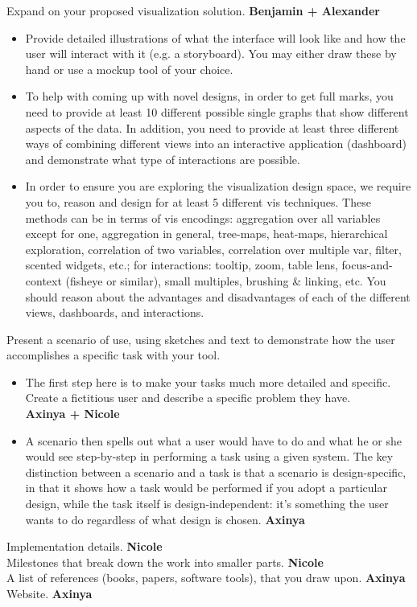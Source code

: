 \documentclass{article}
\begin{document}
 Expand on your proposed visualization solution. \textbf{Benjamin + Alexander}
\begin{itemize}
\item Provide detailed illustrations of what the interface will look like and how the user will interact with it (e.g. a storyboard). You may either draw these by hand or use a mockup tool of your choice.
\item To help with coming up with novel designs, in order to get full marks, you need to provide at least 10 different possible single graphs that show different aspects of the data. In addition, you need to provide at least three different ways of combining different views into an interactive application (dashboard) and demonstrate what type of interactions are possible.
\item In order to ensure you are exploring the visualization design space, we require you to, reason and design for at least 5 different vis techniques. These methods can be in terms of vis encodings: aggregation over all variables except for one, aggregation in general, tree-maps, heat-maps, hierarchical exploration, correlation of two variables, correlation over multiple var, filter, scented widgets, etc.; for interactions: tooltip, zoom, table lens, focus-and-context (fisheye or similar), small multiples, brushing & linking, etc.
You should reason about the advantages and disadvantages of each of the different views, dashboards, and interactions. 
\end{itemize}
Present a scenario of use, using sketches and text to demonstrate how the user accomplishes a specific task with your tool. 
\begin{itemize}
\item The first step here is to make your tasks much more detailed and specific. Create a fictitious user and describe a specific problem they have. \\ \textbf{Axinya + Nicole}
\item A scenario then spells out what a user would have to do and what he or she would see step-by-step in performing a task using a given system. The key distinction between a scenario and a task is that a scenario is design-specific, in that it shows how a task would be performed if you adopt a particular design, while the task itself is design-independent: it's something the user wants to do regardless of what design is chosen. \textbf{Axinya}
\end{itemize}
  Implementation details. \textbf{Nicole} \\
  Milestones that break down the work into smaller parts. \textbf{Nicole}\\
  A list of references (books, papers, software tools), that you draw upon. \textbf{Axinya}\\
 Website. \textbf{Axinya}
\end{document}
